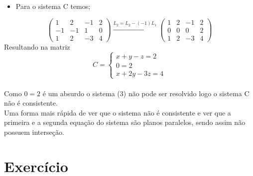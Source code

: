 \documentclass{article}
\begin{document}
      \begin{itemize}
          \item Para o sistema C temos;
      \end{itemize}
    \begin{equation*}\begin{pmatrix}
      1 & 2 & -1 &2 \\ 
       -1& -1 &  1& 0\\ 
       1&  2&  -3& 4
      \end{pmatrix}
      \xrightarrow[]{L_2=L_2 - (-1)L_1} 
      \begin{pmatrix}
      1 & 2 & -1 &2 \\ 
       0& 0 &  0& 2\\ 
       1&  2&  -3& 4
      \end{pmatrix}\end{equation*}
 Resultando na matriz
\begin{equation}
  C = \left\{\begin{matrix}  x + y - z = 2 \\ 0 = 2 \\ x+2y-3z=4 \end{matrix}\right.
\end{equation} 
\\
Como $0=2$ é um absurdo o sistema (3) não pode ser resolvido logo o sistema C não é consistente.\\
Uma forma mais rápida de ver que o sistema não é consistente e ver que a primeira e a segunda equação do sistema são planos paralelos, sendo assim não possuem interseção.

\section{Exercício }
\end{document}
